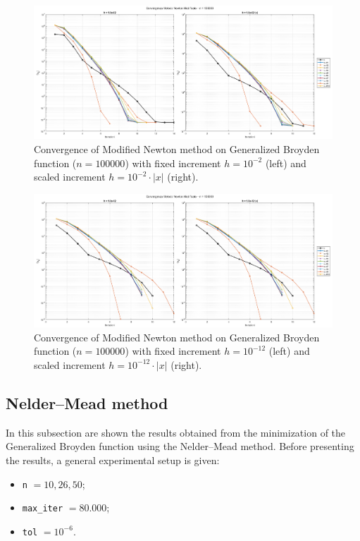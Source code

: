 \documentclass[a4paper,12pt]{article}
\begin{document}
\begin{itemize}
	\newpage
	\begin{figure}[H]
		\centering
		\includegraphics[width=\textwidth]{../immagini/broyden_100k_h2.png}
		\caption{Convergence of Modified Newton method on Generalized Broyden function ($n=100000$) with fixed increment $h = 10^{-2}$ (left) and scaled increment $h = 10^{-2}\cdot|x|$ (right).}
		\label{fig:fd_broyden_100k_h2}
	\end{figure}
	
	\begin{figure}[htbp]
		\centering
		\includegraphics[width=\textwidth]{../immagini/broyden_100k_h12.png}
		\caption{Convergence of Modified Newton method on Generalized Broyden function ($n=100000$) with fixed increment $h = 10^{-12}$ (left) and scaled increment $h = 10^{-12}\cdot|x|$ (right).}
		\label{fig:fd_broyden_100k_h12}
	\end{figure}
	\end{itemize}
	\newpage
		
	\newpage
	
	\subsection{Nelder–Mead method}
	
	In this subsection are shown the results obtained from the minimization of the Generalized Broyden function using the Nelder--Mead method. Before presenting the results, a general experimental setup is given:
	\begin{itemize}
		\item \texttt{n} $= 10, 26, 50$;
		\item \texttt{max\_iter} $= 80.000$;
		\item \texttt{tol} $= 10^{-6}$.
	\end{itemize}
	
\end{document}
